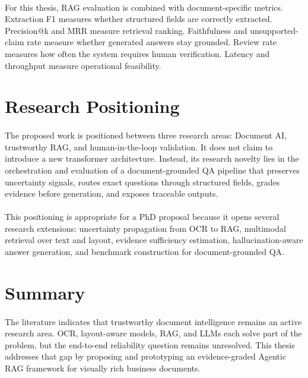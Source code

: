 \paragraph{} For this thesis, RAG evaluation is combined with document-specific metrics. Extraction F1 measures whether structured fields are correctly extracted. Precision@k and MRR measure retrieval ranking. Faithfulness and unsupported-claim rate measure whether generated answers stay grounded. Review rate measures how often the system requires human verification. Latency and throughput measure operational feasibility.

\section{Research Positioning}
\paragraph{} The proposed work is positioned between three research areas: Document AI, trustworthy RAG, and human-in-the-loop validation. It does not claim to introduce a new transformer architecture. Instead, its research novelty lies in the orchestration and evaluation of a document-grounded QA pipeline that preserves uncertainty signals, routes exact questions through structured fields, grades evidence before generation, and exposes traceable outputs.

\paragraph{} This positioning is appropriate for a PhD proposal because it opens several research extensions: uncertainty propagation from OCR to RAG, multimodal retrieval over text and layout, evidence sufficiency estimation, hallucination-aware answer generation, and benchmark construction for document-grounded QA.

\section{Summary}
\paragraph{} The literature indicates that trustworthy document intelligence remains an active research area. OCR, layout-aware models, RAG, and LLMs each solve part of the problem, but the end-to-end reliability question remains unresolved. This thesis addresses that gap by proposing and prototyping an evidence-graded Agentic RAG framework for visually rich business documents.
